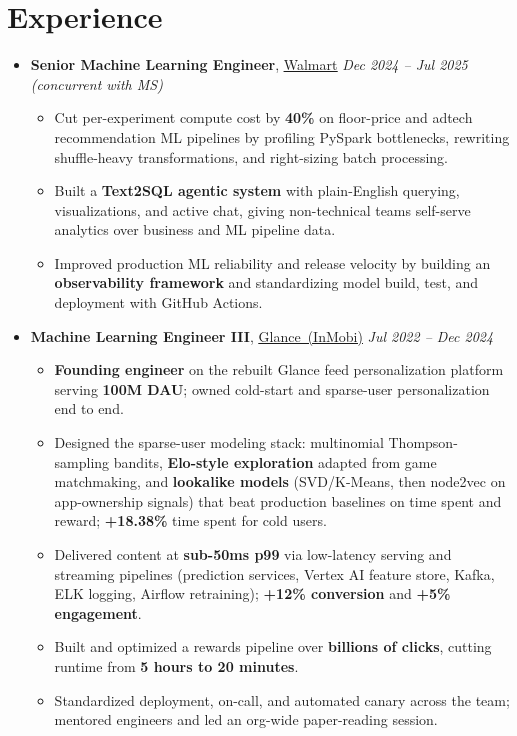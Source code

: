 \documentclass[letterpaper, 11pt]{article}
\let\oldhref\href
\renewcommand{\href}[2]{\oldhref{#1}{\uline{#2}}}
\newcommand{\resumeEntry}[3]{\item{\textbf{#1}, #2 \textbar{} \textit{#3}}}
\begin{document}
\section{Experience}
\begin{itemize}[leftmargin=0pt, label={}]
  \resumeEntry{Senior Machine Learning Engineer}{\href{https://walmart.com/}{Walmart}}{Dec 2024 -- Jul 2025 (concurrent with MS)}
  \begin{itemize}
    \item{Cut per-experiment compute cost by \textbf{40\%} on floor-price and adtech recommendation ML pipelines by profiling PySpark bottlenecks, rewriting shuffle-heavy transformations, and right-sizing batch processing.}
    \item{Built a \textbf{Text2SQL agentic system} with plain-English querying, visualizations, and active chat, giving non-technical teams self-serve analytics over business and ML pipeline data.}
    \item{Improved production ML reliability and release velocity by building an \textbf{observability framework} and standardizing model build, test, and deployment with GitHub Actions.}
  \end{itemize}

  \resumeEntry{Machine Learning Engineer III}{\href{https://glance.com/}{\mbox{Glance (InMobi)}}}{Jul 2022 -- Dec 2024}
  \begin{itemize}
    \item{\textbf{Founding engineer} on the rebuilt Glance feed personalization platform serving \textbf{100M DAU}; owned cold-start and sparse-user personalization end to end.}
    \item{Designed the sparse-user modeling stack: multinomial Thompson-sampling bandits, \textbf{Elo-style exploration} adapted from game matchmaking, and \textbf{lookalike models} (SVD/K-Means, then node2vec on app-ownership signals) that beat production baselines on time spent and reward; \textbf{+18.38\%} time spent for cold users.}
    \item{Delivered content at \textbf{sub-50ms p99} via low-latency serving and streaming pipelines (prediction services, Vertex AI feature store, Kafka, ELK logging, Airflow retraining); \textbf{+12\% conversion} and \textbf{+5\% engagement}.}
    \item{Built and optimized a rewards pipeline over \textbf{billions of clicks}, cutting runtime from \textbf{5 hours to 20 minutes}.}
    \item{Standardized deployment, on-call, and automated canary across the team; mentored engineers and led an org-wide paper-reading session.}
  \end{itemize}


\end{itemize}
\end{document}
